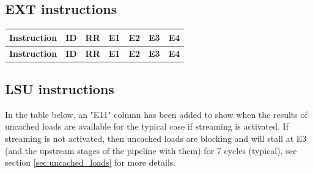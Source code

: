 \begin{landscape}
\subsection{EXT instructions}
\begin{small}
\begin{longtable}{|l|P{1.5cm}|P{1.5cm}|P{1.5cm}|P{1.5cm}|P{1.5cm}|P{1.5cm}|}
\hline \textbf{Instruction} & \textbf{ID} & \textbf{RR} & \textbf{E1} & \textbf{E2} & \textbf{E3} & \textbf{E4} \\
\hline
\hline
\endfirsthead
\hline \textbf{Instruction} & \textbf{ID} & \textbf{RR} & \textbf{E1} & \textbf{E2} & \textbf{E3} & \textbf{E4} \\
\hline
\endhead
\end{longtable}
\end{small}
\newpage
\subsection{LSU instructions}
In the table below, an "E11" column has been added to show when the results of uncached loads are available for the typical case if streaming is activated. If streaming is not activated, then uncached loads are blocking and will stall at E3 (and the upstream stages of the pipeline with them) for 7 cycles (typical), see section \ref{sec:uncached_loads} for more details.


\end{landscape}
